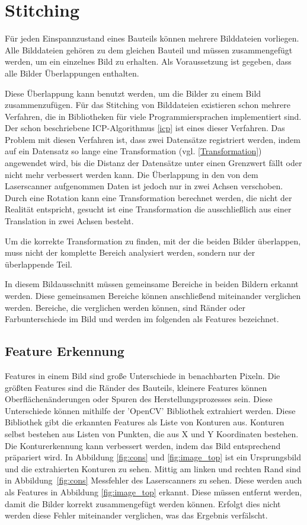 
\chapter{Stitching}

Für jeden Einspannzustand eines Bauteils können mehrere Bilddateien vorliegen.
Alle Bilddateien gehören zu dem gleichen Bauteil und müssen 
zusammengefügt werden, um ein einzelnes Bild zu erhalten. 
Als Voraussetzung ist gegeben, dass alle Bilder Überlappungen enthalten.

Diese Überlappung kann benutzt werden, um die Bilder zu einem Bild zusammenzufügen.
Für das Stitching von Bilddateien existieren schon mehrere Verfahren, die in Bibliotheken
für viele Programmiersprachen implementiert sind. Der schon beschriebene 
ICP-Algorithmus \ref{icp}
ist eines dieser Verfahren. Das Problem mit diesen Verfahren ist, dass zwei 
Datensätze registriert werden, indem auf ein Datensatz so lange eine 
Transformation (vgl. \ref*{Transformation}) angewendet wird, bis
die Distanz der Datensätze unter einen Grenzwert fällt oder nicht mehr verbessert
werden kann. Die Überlappung in den von dem Laserscanner aufgenommen Daten ist jedoch 
nur in zwei Achsen verschoben. Durch eine Rotation kann eine Transformation 
berechnet werden, die nicht der Realität entspricht, gesucht ist eine Transformation 
die ausschließlich aus einer Translation in zwei Achsen besteht.

Um die korrekte Transformation zu finden, mit der die beiden Bilder überlappen,
muss nicht der komplette Bereich analysiert werden, sondern nur der überlappende Teil.

In diesem Bildausschnitt müssen gemeinsame Bereiche in beiden Bildern erkannt werden. 
Diese gemeinsamen Bereiche können anschließend miteinander verglichen werden.
Bereiche, die verglichen werden können, sind Ränder oder Farbunterschiede im Bild 
und werden im folgenden als Features bezeichnet.

\section{Feature Erkennung} \label{contoursearching}

Features in einem Bild sind große Unterschiede in benachbarten Pixeln. Die größten
Features sind die Ränder des Bauteils, kleinere Features können Oberflächenänderungen 
oder Spuren des Herstellungsprozesses sein. Diese Unterschiede können mithilfe 
der 'OpenCV' Bibliothek extrahiert werden. Diese Bibliothek gibt die erkannten 
Features als Liste von Konturen aus. Konturen selbst bestehen aus Listen von 
Punkten, die aus X und Y Koordinaten bestehen. Die Konturerkennung kann verbessert 
werden, indem das Bild entsprechend präpariert wird. In Abbildung \ref{fig:cons} und
\ref{fig:image_top} ist ein Ursprungsbild und die extrahierten Konturen zu sehen.
Mittig am linken und rechten Rand sind in Abbildung~\ref{fig:cons}
Messfehler des Laserscanners zu sehen. Diese werden auch als Features in 
Abbildung \ref{fig:image_top} erkannt. Diese müssen entfernt werden, damit die Bilder 
korrekt zusammengefügt werden können. Erfolgt dies nicht werden diese Fehler miteinander
verglichen, was das Ergebnis verfälscht.

